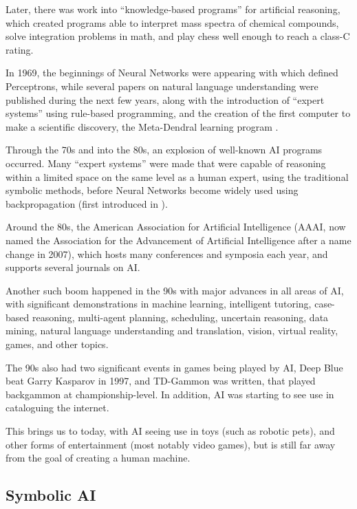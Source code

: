 \documentclass[]{report}
\begin{document}
Later, there was work into ``knowledge-based programs'' for artificial
reasoning, which created programs able to interpret mass spectra of chemical
compounds, solve integration problems in math, and play chess well enough to
reach a class-C rating.

In 1969, the beginnings of Neural Networks were appearing with
\citet{minsky1969perceptrons} which defined Perceptrons, while several papers on
natural language understanding were published during the next few years, along
with the introduction of ``expert systems'' using rule-based programming, and
the creation of the first computer to make a scientific discovery, the
Meta-Dendral learning program \citep{buchanan1976applications}.

Through the 70s and into the 80s, an explosion of well-known AI programs
occurred. Many ``expert systems'' were made that were capable of reasoning
within a limited space on the same level as a human expert, using the
traditional symbolic methods, before Neural Networks become widely used using
backpropagation (first introduced in \citet{werbos1974beyond}).

Around the 80s, the American Association for Artificial Intelligence (AAAI, now
named the Association for the Advancement of Artificial Intelligence after a
name change in 2007), which hosts many conferences and symposia each year, and
supports several journals on AI.

Another such boom happened in the 90s with major advances in all areas of AI,
with significant demonstrations in machine learning, intelligent tutoring,
case-based reasoning, multi-agent planning, scheduling, uncertain reasoning,
data mining, natural language understanding and translation, vision, virtual
reality, games, and other topics.

The 90s also had two significant events in games being played by AI, Deep Blue
beat Garry Kasparov in 1997, and TD-Gammon was written, that played backgammon
at championship-level. In addition, AI was starting to see use in cataloguing
the internet.

This brings us to today, with AI seeing use in toys (such as robotic pets), and
other forms of entertainment (most notably video games), but is still far away
from the goal of creating a human machine.

\subsection{Symbolic AI}
\label{sec:symbolic-ai}
\end{document}
